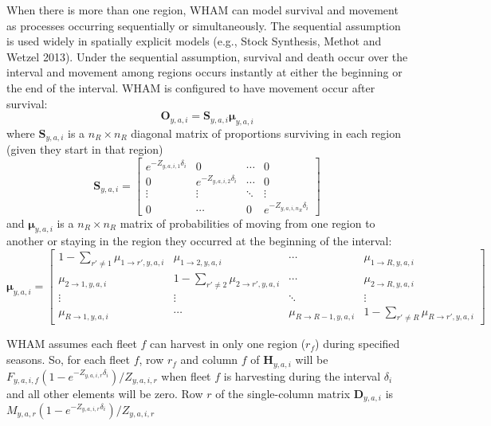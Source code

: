 \documentclass[
]{article}
\begin{document}
When there is more than one region, WHAM can model survival and movement as processes occurring sequentially or simultaneously. The sequential assumption is used widely in spatially explicit models (e.g., Stock Synthesis, Methot and Wetzel 2013). Under the sequential assumption, survival and death occur over the interval and movement among regions occurs instantly at either the beginning or the end of the interval. WHAM is configured to have movement occur after survival:
\begin{equation*}
  \mathbf{O}_{y,a,i} = \mathbf{S}_{y,a,i}\boldsymbol{\mu}_{y,a,i}
\end{equation*}
where \(\mathbf{S}_{y,a,i}\) is a \(n_R \times n_R\) diagonal matrix of proportions surviving in each region (given they start in that region)
\begin{equation*}
\mathbf{S}_{y,a,i} = 
  \begin{bmatrix}
    e^{-Z_{y,a,i,1}\delta_i} & 0 & \cdots & 0 \\
    0 & e^{-Z_{y,a,i,2}\delta_i} & \cdots & 0 \\
    \vdots & \vdots & \ddots & \vdots \\
    0 & \cdots & 0 & e^{-Z_{y,a,i,n_R}\delta_i}
  \end{bmatrix}
\end{equation*}
and \(\boldsymbol{\mu}_{y,a,i}\) is a \(n_R \times n_R\) matrix of probabilities of moving from one region to another or staying in the region they occurred at the beginning of the interval:
\begin{equation*}
\boldsymbol{\mu}_{y,a,i} = 
  \begin{bmatrix}
    1-\sum_{r' \neq 1} \mu_{1\rightarrow r',y,a,i} & \mu_{1\rightarrow 2,y,a,i} & \cdots & \mu_{1\rightarrow R,y,a,i} \\
    \mu_{2\rightarrow 1,y,a,i} & 1-\sum_{r' \neq 2} \mu_{2\rightarrow r',y,a,i} & \cdots & \mu_{2\rightarrow R,y,a,i} \\
    \vdots & \vdots & \ddots & \vdots \\
    \mu_{R\rightarrow 1,y,a,i} & \cdots & \mu_{R\rightarrow R-1,y,a,i} & 1-\sum_{r' \neq R} \mu_{R\rightarrow r',y,a,i}
  \end{bmatrix}
\end{equation*}

WHAM assumes each fleet \(f\) can harvest in only one region (\(r_f\)) during specified seasons. So, for each fleet \(f\), row \(r_f\) and column \(f\) of \(\mathbf{H}_{y,a,i}\) will be \(F_{y,a,i,f}\left(1 - e^{-Z_{y,a,i,r}\delta_i}\right)/Z_{y,a,i,r}\) when fleet \(f\) is harvesting during the interval \(\delta_i\) and all other elements will be zero. Row \(r\) of the single-column matrix \(\mathbf{D}_{y,a,i}\) is \(M_{y,a,r}\left(1 - e^{-Z_{y,a,i,r}\delta_i}\right)/Z_{y,a,i,r}\)
\end{document}
